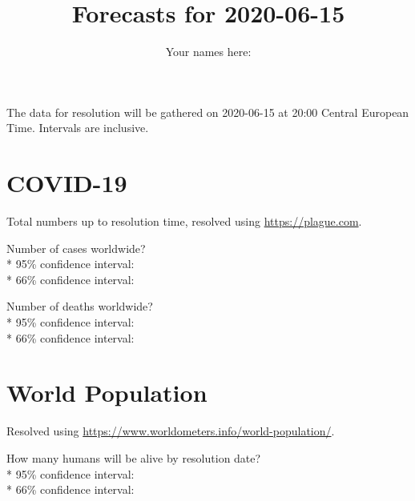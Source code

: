 \documentclass{article}
\title{Forecasts for 2020-06-15}
\begin{document}
\date{\vspace{-7ex}}

\author{Your names here: \underline{\hspace{10cm}}}

\maketitle

\vspace{0.5cm}

The data for resolution will be gathered on 2020-06-15 at 20:00 Central
European Time. Intervals are inclusive.

\section*{COVID-19}

Total numbers up to resolution time, resolved using
\href{https://plague.com/}{https://plague.com}.

Number of cases worldwide?\\*
95\% confidence interval: \null\hfill\underline{\hspace{8cm}}\\*
66\% confidence interval: \null\hfill\underline{\hspace{8cm}}

\vspace{0.3cm}

Number of deaths worldwide?\\*
95\% confidence interval: \null\hfill\underline{\hspace{8cm}}\\*
66\% confidence interval: \null\hfill\underline{\hspace{8cm}}

\section*{World Population}

Resolved using
\href{https://www.worldometers.info/world-population/}{https://www.worldometers.info/world-population/}.

\vspace{0.3cm}

How many humans will be alive by resolution date?\\*
95\% confidence interval: \null\hfill\underline{\hspace{8cm}}\\*
66\% confidence interval: \null\hfill\underline{\hspace{8cm}}
\end{document}
